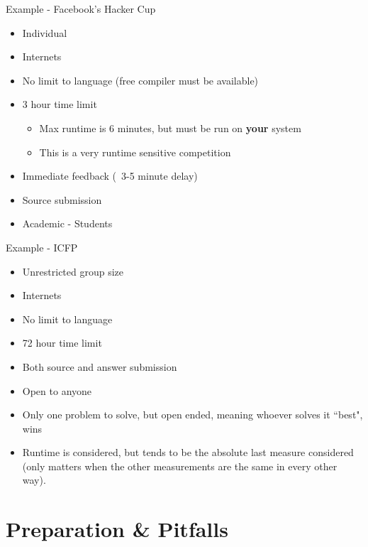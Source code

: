 \documentclass{beamer}
\begin{document}
\begin{frame}{Example - Facebook's Hacker Cup}
  \begin{centering}
    \begin{itemize}
      \item Individual
      \item Internets
      \item No limit to language (free compiler must be available)
      \item 3 hour time limit
      \begin{itemize}
        \item Max runtime is 6 minutes, but must be run on \textbf{your} system
        \item This is a very runtime sensitive competition
      \end{itemize}
      \item Immediate feedback (~3-5 minute delay)
      \item Source submission
      \item Academic - Students
    \end{itemize}
  \end{centering}
\end{frame}

  
\begin{frame}{Example - ICFP}
  \begin{centering}
    \begin{itemize}
      \item Unrestricted group size
      \item Internets
      \item No limit to language
      \item 72 hour time limit
      \item Both source and answer submission
      \item Open to anyone
      \item Only one problem to solve, but open ended, meaning whoever solves it ``best", wins
      \item Runtime is considered, but tends to be the absolute last measure considered (only matters when the other measurements are the same in every other way).
    \end{itemize}
  \end{centering}
\end{frame}

\section{Preparation \& Pitfalls}
\end{document}
